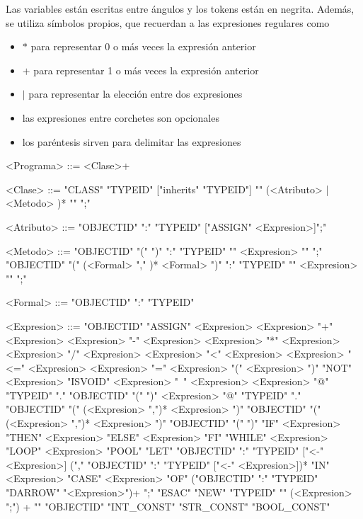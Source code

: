 \documentclass{article}
\begin{document}
Las variables están escritas entre ángulos y los tokens están en negrita.
Además, se utiliza símbolos propios, que recuerdan a las expresiones regulares como
\begin{itemize}
\item $*$ para representar 0 o más veces la expresión anterior
\item $+$ para representar 1 o más veces la expresión anterior
\item $|$ para representar la elección entre dos expresiones
\item las expresiones entre corchetes son opcionales
\item los paréntesis sirven para delimitar las expresiones
\end{itemize}
\begin{grammar}
<Programa> ::= <Clase>+

<Clase> ::= "CLASS" "TYPEID" ["inherits" "TYPEID"] "{" (<Atributo> | <Metodo> )* "}" ";"


<Atributo> ::= "OBJECTID" ":" "TYPEID" ["ASSIGN" <Expresion>]";"

<Metodo> ::=  "OBJECTID" "("  ")" ":" "TYPEID" "{" <Expresion> "}" ";"
\alt "OBJECTID" "(" (<Formal>  "," )* <Formal>  ")" ":" "TYPEID" "{" <Expresion> "}" ";"

<Formal> ::= "OBJECTID" ":" "TYPEID"

<Expresion> ::= "OBJECTID" "ASSIGN" <Expresion>
\alt <Expresion> "+" <Expresion>
\alt <Expresion> "-" <Expresion>
\alt <Expresion> "*" <Expresion>
\alt <Expresion> "/" <Expresion>
\alt <Expresion> "<" <Expresion>
\alt <Expresion> "<=" <Expresion>
\alt <Expresion> "=" <Expresion>
\alt "(" <Expresion> ")"
\alt "NOT" <Expresion>
\alt "ISVOID" <Expresion>
\alt "~" <Expresion>
\alt <Expresion> "@" "TYPEID" "." "OBJECTID" "(" ")"
\alt <Expresion> "@" "TYPEID" "." "OBJECTID" "(" (<Expresion> ",")* <Expresion> ")"
\alt [ <Expresion> "."] "OBJECTID" "(" (<Expresion> ",")* <Expresion> ")"
\alt [ <Expresion> "."] "OBJECTID" "(" ")"
\alt "IF" <Expresion> "THEN" <Expresion> "ELSE" <Expresion> "FI"
\alt "WHILE" <Expresion> "LOOP" <Expresion> "POOL"
\alt "LET" "OBJECTID" ":" "TYPEID" ["<-" <Expresion>] ("," "OBJECTID" ":" "TYPEID" ["<-" <Expresion>])* "IN" <Expresion>
\alt "CASE" <Expresion> "OF" ("OBJECTID" ":" "TYPEID" "DARROW" "<Expresion>")+ ";" "ESAC"
\alt "NEW" "TYPEID"
\alt "{" (<Expresion> ";") + "}"
\alt "OBJECTID"
\alt "INT_CONST"
\alt "STR_CONST"
\alt "BOOL_CONST"


\end{grammar}
\end{document}
